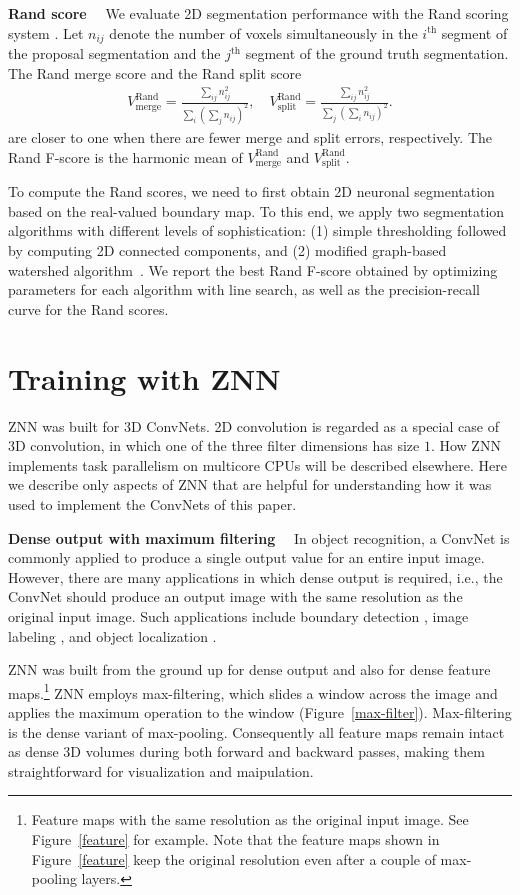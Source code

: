 \documentclass{article} %
\begin{document}
{\bf Rand score}$\quad$
We evaluate 2D segmentation performance with the Rand scoring system \cite{Rand1971,Unnikrishnan2007}. Let $n_{ij}$ denote the number of voxels simultaneously in the $i^\text{th}$ segment of the proposal segmentation and the $j^\text{th}$ segment of the ground truth segmentation. The Rand merge score and the Rand split score \begin{align*}
  V^\text{Rand}_\text{merge} = \frac{\sum_{ij}n_{ij}^2}{\sum_i(\sum_j n_{ij})^2},\quad
  V^\text{Rand}_\text{split} = \frac{\sum_{ij}n_{ij}^2}{\sum_j(\sum_i n_{ij})^2}.
\end{align*}
are closer to one when there are fewer merge and split errors, respectively. The Rand F-score is the harmonic mean of $V^\text{Rand}_\text{merge}$ and $V^\text{Rand}_\text{split}$.


To compute the Rand scores, we need to first obtain 2D neuronal segmentation based on the real-valued boundary map. To this end, we apply two segmentation algorithms with different levels of sophistication: (1) simple thresholding followed by computing 2D connected components, and (2) modified graph-based watershed algorithm~\cite{Zlateski2015}. We report the best Rand F-score obtained by optimizing parameters for each algorithm with line search, as well as the precision-recall curve for the Rand scores.



\section{Training with ZNN}
ZNN was built for 3D ConvNets. 2D convolution is regarded as a special
case of 3D convolution, in which one of the three filter dimensions
has size $1$. How ZNN implements task parallelism on multicore CPUs
will be described elsewhere. Here we describe only aspects of ZNN that are
helpful for understanding how it was used to implement the ConvNets of this paper.

{\bf Dense output with maximum filtering}$\quad$
In object recognition, a ConvNet is commonly applied to produce a
single output value for an entire input image.  However, there are
many applications in which dense output is required, i.e., the ConvNet
should produce an output image with the same resolution as the
original input image.  Such applications include boundary detection
\cite{Ciresan2012}, image labeling \cite{Long2015}, and object
localization \cite{Sermanet2014}.

ZNN was built from the ground up for dense output and also for dense
feature maps.\footnote{Feature maps with the same resolution as the original input image.
See Figure~\ref{feature} for example. Note that the feature maps shown in Figure~\ref{feature}
keep the original resolution even after a couple of max-pooling layers.}
ZNN employs max-filtering, which slides a window across
the image and applies the maximum operation to the window (Figure~\ref{max-filter}).
Max-filtering is the dense variant of max-pooling.  Consequently all
feature maps remain intact as dense 3D volumes during both forward and
backward passes, making them straightforward for visualization and maipulation.
\end{document}
